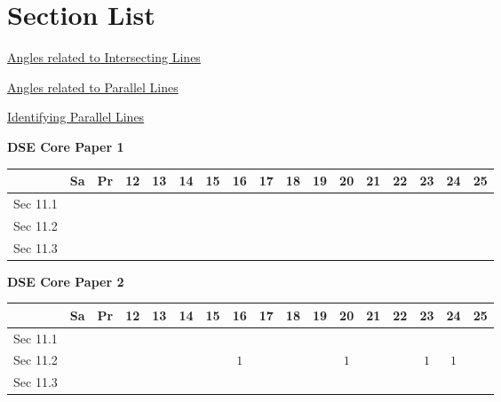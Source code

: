 \documentclass[12pt, a4paper]{article}
\begin{document}
\section*{Section List}
\begin{enumx}[label=Sec 11.\arabic*\ ]
\item \hyperref[section:1-11-1]{Angles related to Intersecting Lines}
\item \hyperref[section:1-11-2]{Angles related to Parallel Lines}
\item \hyperref[section:1-11-3]{Identifying Parallel Lines}
\end{enumx}
\begin{absolutelynopagebreak}
\begin{center}
\textbf{DSE Core Paper 1}
\end{center}
\begin{center}
\begin{tabular}{|l|c|c|c|c|c|c|c|c|c|c|c|c|c|c|c|c|}
\hline
        & Sa & Pr & 12 & 13 & 14 & 15 & 16 & 17 & 18 & 19 & 20 & 21 & 22 & 23 & 24 & 25 \\\hline\hline
Sec 11.1 &  &  &  &  &  &  &  &  &  &  &  &  &  &  &  &  \\\hline
Sec 11.2 &  &  &  &  &  &  &  &  &  &  &  &  &  &  &  &  \\\hline
Sec 11.3 &  &  &  &  &  &  &  &  &  &  &  &  &  &  &  &  \\\hline
\end{tabular}
\end{center}
\end{absolutelynopagebreak}
\begin{absolutelynopagebreak}
\begin{center}
\textbf{DSE Core Paper 2}
\end{center}
\begin{center}
\begin{tabular}{|l|c|c|c|c|c|c|c|c|c|c|c|c|c|c|c|c|}
\hline
        & Sa & Pr & 12 & 13 & 14 & 15 & 16 & 17 & 18 & 19 & 20 & 21 & 22 & 23 & 24 & 25 \\\hline\hline
Sec 11.1 &  &  &  &  &  &  &  &  &  &  &  &  &  &  &  &  \\\hline
Sec 11.2 &  &  &  &  &  &  &  $1$ &  &  &  &  $1$ &  &  &  $1$ &  $1$ &  \\\hline
Sec 11.3 &  &  &  &  &  &  &  &  &  &  &  &  &  &  &  &  \\\hline
\end{tabular}
\end{center}
\end{absolutelynopagebreak}
\end{document}
